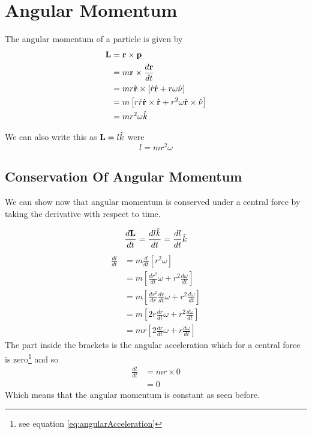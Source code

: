 \section{Angular Momentum}
The angular momentum of a particle is given by
\begin{align}
\mathbf{L}&=\mathbf{r} \times \mathbf{p} \nonumber \\
&=m \mathbf{r}\times \frac{d \mathbf{r}}{d t} \nonumber \\
&=m r \hat{\mathbf{r}} \times \left[ \dot{r} \hat{\mathbf{r}} + r \omega \hat{\mathbf{\nu}} \right] \nonumber \\
&=m \left[ r \dot{r}\hat{\mathbf{r}} \times \hat{\mathbf{r}} + r^2 \omega \hat{\mathbf{r}} \times\hat{\mathbf{\nu}} \right] \nonumber \\
&=m r^2 \omega \hat{k} \label{eq:AngularMomentum}
\end{align}

We can also write this as $\mathbf{L} = l \hat{k}$ were
\begin{equation}
l=mr^2\omega \label{eq:AngularMomentumScalar}
\end{equation}

\subsection{Conservation Of Angular Momentum}
We can show now that angular momentum is conserved under a central force by taking the derivative with respect to time.

\begin{equation}
\frac{d\mathbf{L}}{dt} = \frac{d l \hat{k}}{dt} = \frac{d l}{dt}\hat{k}
\end{equation}
\begin{align}
\frac{dl}{dt}&=m\frac{d}{dt}\left[r^2\omega\right]\nonumber \\
&=m\left[\frac{dr^2}{dt}\omega + r^2\frac{d\omega}{dt}\right]\nonumber \\
&=m\left[\frac{dr^2}{dr}\frac{dr}{dt}\omega + r^2\frac{d\omega}{dt}\right] \nonumber \\
&=m\left[2r\frac{dr}{dt}\omega + r^2\frac{d\omega}{dt}\right] \nonumber \\
&=mr\left[2\frac{dr}{dt}\omega + r\frac{d\omega}{dt}\right]
\end{align}
The part inside the brackets is the angular acceleration which for a central force is zero\footnote{see equation \ref{eq:angularAcceleration}} and so
\begin{align}
\frac{dl}{dt}&=mr \times 0 \nonumber \\
&=0
\end{align}
Which means that the angular momentum is constant as seen before.


